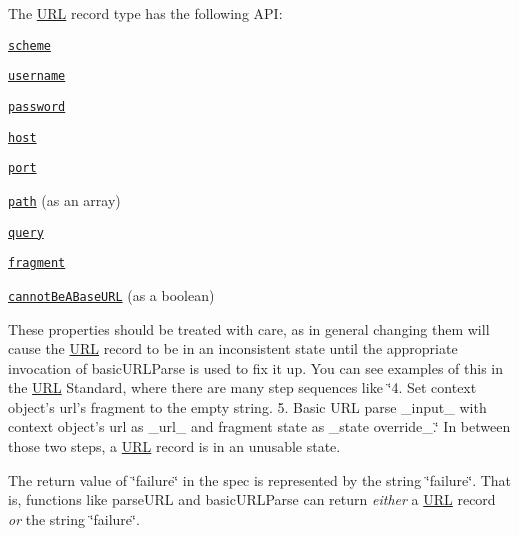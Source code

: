 The \mbox{\hyperlink{namespace_u_r_l}{U\+RL}} record type has the following A\+PI\+:


\begin{DoxyItemize}
\item \href{https://url.spec.whatwg.org/#concept-url-scheme}{\tt {\ttfamily scheme}}
\item \href{https://url.spec.whatwg.org/#concept-url-username}{\tt {\ttfamily username}}
\item \href{https://url.spec.whatwg.org/#concept-url-password}{\tt {\ttfamily password}}
\item \href{https://url.spec.whatwg.org/#concept-url-host}{\tt {\ttfamily host}}
\item \href{https://url.spec.whatwg.org/#concept-url-port}{\tt {\ttfamily port}}
\item \href{https://url.spec.whatwg.org/#concept-url-path}{\tt {\ttfamily path}} (as an array)
\item \href{https://url.spec.whatwg.org/#concept-url-query}{\tt {\ttfamily query}}
\item \href{https://url.spec.whatwg.org/#concept-url-fragment}{\tt {\ttfamily fragment}}
\item \href{https://url.spec.whatwg.org/#url-cannot-be-a-base-url-flag}{\tt {\ttfamily cannot\+Be\+A\+Base\+U\+RL}} (as a boolean)
\end{DoxyItemize}

These properties should be treated with care, as in general changing them will cause the \mbox{\hyperlink{namespace_u_r_l}{U\+RL}} record to be in an inconsistent state until the appropriate invocation of {\ttfamily basic\+U\+R\+L\+Parse} is used to fix it up. You can see examples of this in the \mbox{\hyperlink{namespace_u_r_l}{U\+RL}} Standard, where there are many step sequences like \char`\"{}4. Set context object’s url’s fragment to the empty string. 5. Basic U\+R\+L parse \+\_\+input\+\_\+ with context object’s url as \+\_\+url\+\_\+ and fragment state as \+\_\+state override\+\_\+.\char`\"{} In between those two steps, a \mbox{\hyperlink{namespace_u_r_l}{U\+RL}} record is in an unusable state.

The return value of \char`\"{}failure\char`\"{} in the spec is represented by the string {\ttfamily \char`\"{}failure\char`\"{}}. That is, functions like {\ttfamily parse\+U\+RL} and {\ttfamily basic\+U\+R\+L\+Parse} can return {\itshape either} a \mbox{\hyperlink{namespace_u_r_l}{U\+RL}} record {\itshape or} the string {\ttfamily \char`\"{}failure\char`\"{}}. 